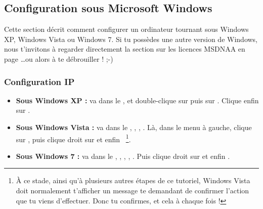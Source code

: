 


\subsection{Configuration sous Microsoft Windows}


Cette section d\'ecrit comment configurer un ordinateur tournant sous Windows XP, Windows Vista ou Windows 7. Si tu poss\`edes une autre version de Windows,
nous t'invitons \`a  regarder directement la section sur les licences MSDNAA en page \pageref{msdnaa}\dots ou alors \`a  te d\'ebrouiller ! ;-)

\subsubsection{Configuration IP}

\begin{itemize}

\item \textbf{Sous Windows XP :} va dans le ,  et double-clique sur  puis sur . Clique enfin sur .

\item \textbf{Sous Windows Vista :} va dans le , , , . L\`a, dans le menu \`a  gauche, clique sur , puis clique droit sur  et enfin  ~\footnote{\`A ce stade, ainsi qu'\`a  plusieurs autres \'etapes de ce tutoriel, Windows Vista doit normalement t'afficher un message te demandant de confirmer l'action que tu viens d'effectuer. Donc tu confirmes, et cela \`a  chaque fois !}.

\item \textbf{Sous Windows 7 :} va dans le , , , , . Puis clique droit sur  et enfin  .

\end{itemize}



